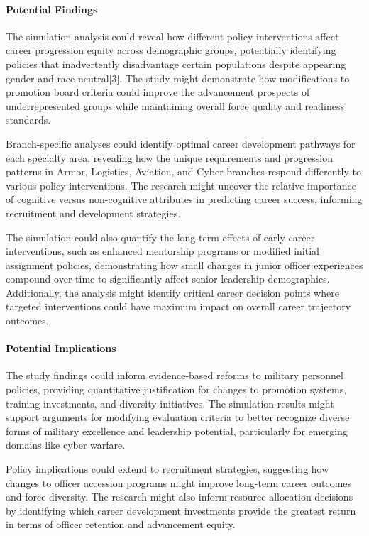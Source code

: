 \documentclass[main.tex]{subfiles}
\begin{document}
\paragraph{Potential Findings}

The simulation analysis could reveal how different policy interventions affect career progression equity across demographic groups, potentially identifying policies that inadvertently disadvantage certain populations despite appearing gender and race-neutral[3]. The study might demonstrate how modifications to promotion board criteria could improve the advancement prospects of underrepresented groups while maintaining overall force quality and readiness standards.

Branch-specific analyses could identify optimal career development pathways for each specialty area, revealing how the unique requirements and progression patterns in Armor, Logistics, Aviation, and Cyber branches respond differently to various policy interventions. The research might uncover the relative importance of cognitive versus non-cognitive attributes in predicting career success, informing recruitment and development strategies.

The simulation could also quantify the long-term effects of early career interventions, such as enhanced mentorship programs or modified initial assignment policies, demonstrating how small changes in junior officer experiences compound over time to significantly affect senior leadership demographics. Additionally, the analysis might identify critical career decision points where targeted interventions could have maximum impact on overall career trajectory outcomes.

\paragraph{Potential Implications}

The study findings could inform evidence-based reforms to military personnel policies, providing quantitative justification for changes to promotion systems, training investments, and diversity initiatives. The simulation results might support arguments for modifying evaluation criteria to better recognize diverse forms of military excellence and leadership potential, particularly for emerging domains like cyber warfare.

Policy implications could extend to recruitment strategies, suggesting how changes to officer accession programs might improve long-term career outcomes and force diversity. The research might also inform resource allocation decisions by identifying which career development investments provide the greatest return in terms of officer retention and advancement equity.
\end{document}

